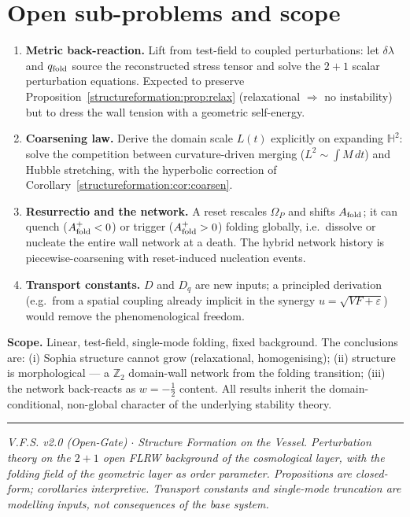 \documentclass[11pt,a4paper,oneside]{book}
\newcommand{\Op}{\Omega_P}
\newcommand{\qf}{q_{\rm fold}}
\newcommand{\Af}{A_{\rm fold}}
\newcommand{\Hh}{\mathbb{H}^2}
\newcommand{\dlam}{\delta\lambda}
\theoremstyle{plain}
\theoremstyle{definition}
\theoremstyle{remark}
\begin{document}
\section{Open sub-problems and scope}

\begin{enumerate}[leftmargin=1.6em,itemsep=3pt]
\item \textbf{Metric back-reaction.} Lift from test-field to coupled perturbations: let $\dlam$ and
$\qf$ source the reconstructed stress tensor and solve the $2{+}1$ scalar perturbation equations. Expected
to preserve Proposition~\ref{structureformation:prop:relax} (relaxational $\Rightarrow$ no instability) but to dress the
wall tension with a geometric self-energy.
\item \textbf{Coarsening law.} Derive the domain scale $L(t)$ explicitly on expanding $\Hh$: solve the
competition between curvature-driven merging ($L^2\sim\int M\,dt$) and Hubble stretching, with the
hyperbolic correction of Corollary~\ref{structureformation:cor:coarsen}.
\item \textbf{Resurrectio and the network.} A reset rescales $\Op$ and shifts $\Af$; it can quench
($\Af^+<0$) or trigger ($\Af^+>0$) folding globally, i.e.\ dissolve or nucleate the entire wall network
at a death. The hybrid network history is piecewise-coarsening with reset-induced nucleation events.
\item \textbf{Transport constants.} $D$ and $D_q$ are new inputs; a principled derivation (e.g.\ from a
spatial coupling already implicit in the synergy $u=\sqrt{VF+\varepsilon}$) would remove the
phenomenological freedom.
\end{enumerate}

\textbf{Scope.} Linear, test-field, single-mode folding, fixed background. The conclusions are: (i)
Sophia structure cannot grow (relaxational, homogenising); (ii) structure is morphological --- a
$\mathbb Z_2$ domain-wall network from the folding transition; (iii) the network back-reacts as
$w=-\tfrac12$ content. All results inherit the domain-conditional, non-global character of the underlying
stability theory.

\vspace{0.5em}
\hrule
\smallskip
\noindent\footnotesize\emph{V.F.S. v2.0 (Open-Gate) $\cdot$ Structure Formation on the Vessel.
Perturbation theory on the $2{+}1$ open FLRW background of the cosmological layer, with the folding field
of the geometric layer as order parameter. Propositions are closed-form; corollaries interpretive.
Transport constants and single-mode truncation are modelling inputs, not consequences of the base
system.}
\end{document}
